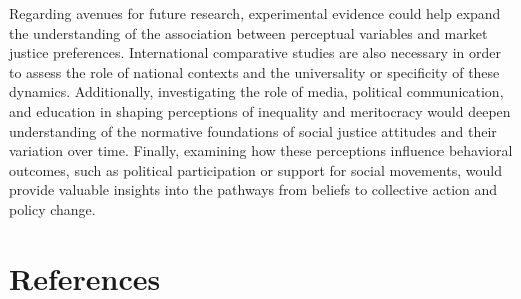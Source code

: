 \documentclass[
  12pt,
]{article}
\begin{document}
Regarding avenues for future research, experimental evidence could help
expand the understanding of the association between perceptual variables
and market justice preferences. International comparative studies are
also necessary in order to assess the role of national contexts and the
universality or specificity of these dynamics. Additionally,
investigating the role of media, political communication, and education
in shaping perceptions of inequality and meritocracy would deepen
understanding of the normative foundations of social justice attitudes
and their variation over time. Finally, examining how these perceptions
influence behavioral outcomes, such as political participation or
support for social movements, would provide valuable insights into the
pathways from beliefs to collective action and policy change.

\section{References}\label{references}
\end{document}
